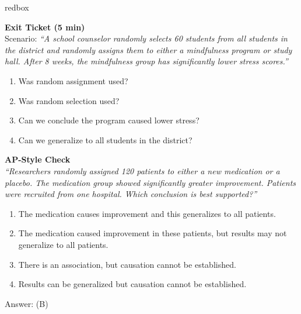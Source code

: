 \documentclass[10pt]{article}
\begin{document}
\begin{skillbox}{redbox}
\begin{minipage}[t]{0.48\linewidth}
    \textbf{Exit Ticket (5 min)}\\
    Scenario: \textit{``A school counselor randomly selects 60 students from all
    students in the district and randomly assigns them to either a mindfulness
    program or study hall. After 8 weeks, the mindfulness group has significantly
    lower stress scores.''}
    \begin{enumerate}
        \item Was random assignment used?
        \item Was random selection used?
        \item Can we conclude the program caused lower stress?
        \item Can we generalize to all students in the district?
    \end{enumerate}
\end{minipage}
\hfill
\begin{minipage}[t]{0.48\linewidth}
    \textbf{AP-Style Check}\\
    \textit{``Researchers randomly assigned 120 patients to either a new medication
    or a placebo. The medication group showed significantly greater improvement.
    Patients were recruited from one hospital. Which conclusion is best
    supported?''}
    \begin{enumerate}[label=(\Alph*)]
        \item The medication causes improvement and this generalizes to all patients.
        \item The medication caused improvement in these patients, but results may
              not generalize to all patients.
        \item There is an association, but causation cannot be established.
        \item Results can be generalized but causation cannot be established.
    \end{enumerate}
    Answer: (B)
\end{minipage}
\end{skillbox}
\end{document}

